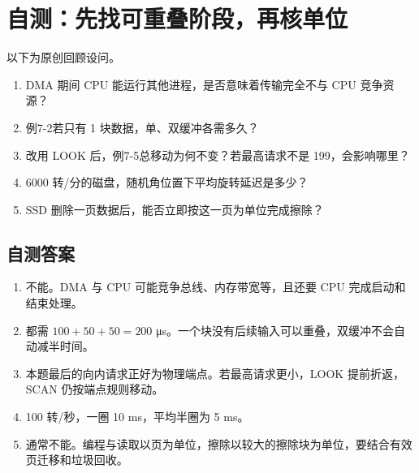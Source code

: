 \section{自测：先找可重叠阶段，再核单位}\label{os-7-review}

以下为原创回顾设问。

\begin{enumerate}
\def\labelenumi{\arabic{enumi}.}
\tightlist
\item
  DMA 期间 CPU 能运行其他进程，是否意味着传输完全不与 CPU 竞争资源？
\item
  例7-2若只有 1 块数据，单、双缓冲各需多久？
\item
  改用 LOOK 后，例7-5总移动为何不变？若最高请求不是 199，会影响哪里？
\item
  6000 转/分的磁盘，随机角位置下平均旋转延迟是多少？
\item
  SSD 删除一页数据后，能否立即按这一页为单位完成擦除？
\end{enumerate}

\subsection{自测答案}\label{os-c07-h185}

\begin{enumerate}
\def\labelenumi{\arabic{enumi}.}
\tightlist
\item
  不能。DMA 与 CPU 可能竞争总线、内存带宽等，且还要 CPU 完成启动和结束处理。
\item
  都需 \(100+50+50=200\) μs。一个块没有后续输入可以重叠，双缓冲不会自动减半时间。
\item
  本题最后的向内请求正好为物理端点。若最高请求更小，LOOK 提前折返，SCAN 仍按端点规则移动。
\item
  100 转/秒，一圈 10 ms，平均半圈为 5 ms。
\item
  通常不能。编程与读取以页为单位，擦除以较大的擦除块为单位，要结合有效页迁移和垃圾回收。
\end{enumerate}
